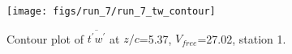 \begin{figure}[H]
\centering
\texttt{[image: figs/run\_7/run\_7\_tw\_contour]}
\caption{Contour plot of $\overline{t^\prime w^\prime}$ at $z/c$=5.37, $V_{free}$=27.02, station 1.}
\label{fig:run_7_tw_contour}
\end{figure}


